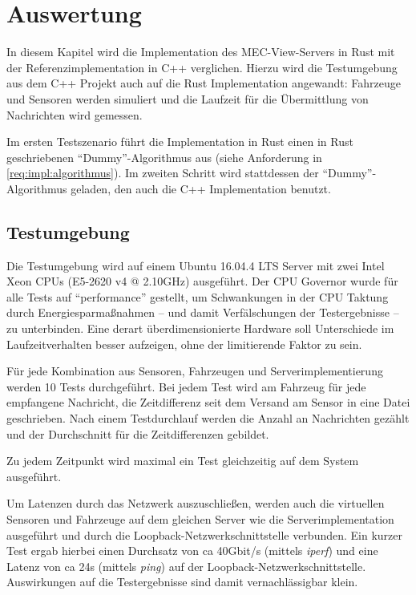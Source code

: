 
			
\chapter{Auswertung}

In diesem Kapitel wird die Implementation des MEC-View-Servers in Rust mit der Referenzimplementation in C++ verglichen.
Hierzu wird die Testumgebung aus dem C++ Projekt auch auf die Rust Implementation angewandt: Fahrzeuge und Sensoren werden simuliert und die Laufzeit für die Übermittlung von Nachrichten wird gemessen.

Im ersten Testszenario führt die Implementation in Rust einen in Rust geschriebenen \enquote{Dummy}-Algorithmus aus (siehe Anforderung  in \autoref{req:impl:algorithmus}).
Im zweiten Schritt wird stattdessen der \enquote{Dummy}-Algorithmus geladen, den auch die C++ Implementation benutzt.



\section{Testumgebung}

Die Testumgebung wird auf einem Ubuntu 16.04.4 LTS Server mit zwei Intel Xeon CPUs (E5-2620 v4 @ 2.10GHz) ausgeführt.
Der CPU Governor wurde für alle Tests auf \enquote{performance} gestellt, um Schwankungen in der CPU Taktung durch Energiesparmaßnahmen -- und damit Verfälschungen der Testergebnisse -- zu unterbinden.
Eine derart überdimensionierte Hardware soll Unterschiede im Laufzeitverhalten besser aufzeigen, ohne der limitierende Faktor zu sein.

Für jede Kombination aus Sensoren, Fahrzeugen und Serverimplementierung werden 10 Tests durchgeführt.
Bei jedem Test wird am Fahrzeug für jede empfangene Nachricht, die Zeitdifferenz seit dem Versand am Sensor in eine Datei geschrieben.
Nach einem Testdurchlauf werden die Anzahl an Nachrichten gezählt und der Durchschnitt für die Zeitdifferenzen gebildet.

Zu jedem Zeitpunkt wird maximal ein Test gleichzeitig auf dem System ausgeführt.

Um Latenzen durch das Netzwerk auszuschließen, werden auch die virtuellen Sensoren und Fahrzeuge auf dem gleichen Server wie die Serverimplementation ausgeführt und durch die Loopback-Netzwerkschnittstelle verbunden.
Ein kurzer Test ergab hierbei einen Durchsatz von ca 40Gbit/s (mittels \textit{iperf}) und eine Latenz von ca 24\textmu{}s (mittels \textit{ping}) auf der Loopback-Netzwerkschnittstelle.
Auswirkungen auf die Testergebnisse sind damit vernachlässigbar klein.


